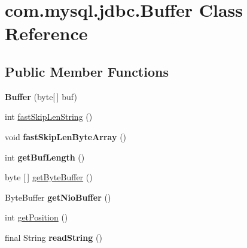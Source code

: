 \hypertarget{classcom_1_1mysql_1_1jdbc_1_1_buffer}{}\section{com.\+mysql.\+jdbc.\+Buffer Class Reference}
\label{classcom_1_1mysql_1_1jdbc_1_1_buffer}
\subsection*{Public Member Functions}
\begin{DoxyCompactItemize}
\item 
\mbox{\label{classcom_1_1mysql_1_1jdbc_1_1_buffer_aded1a2a1e87364b83437aab79524f015}} 
{\bfseries Buffer} (byte\mbox{[}$\,$\mbox{]} buf)
\item 
int \mbox{\hyperlink{classcom_1_1mysql_1_1jdbc_1_1_buffer_a28c84074ea3c21866a0cb59bfa1edcb3}{fast\+Skip\+Len\+String}} ()
\item 
\mbox{\label{classcom_1_1mysql_1_1jdbc_1_1_buffer_aef0e116a1535fa42709dc4f198ff2dc9}} 
void {\bfseries fast\+Skip\+Len\+Byte\+Array} ()
\item 
\mbox{\label{classcom_1_1mysql_1_1jdbc_1_1_buffer_a5fec7969f448c7d92a37ccff056d310f}} 
int {\bfseries get\+Buf\+Length} ()
\item 
byte \mbox{[}$\,$\mbox{]} \mbox{\hyperlink{classcom_1_1mysql_1_1jdbc_1_1_buffer_ae784a6295702aa89204d8d5023e61761}{get\+Byte\+Buffer}} ()
\item 
\mbox{\label{classcom_1_1mysql_1_1jdbc_1_1_buffer_ade4bafd26b1eef0c1a687a3eee62651d}} 
Byte\+Buffer {\bfseries get\+Nio\+Buffer} ()
\item 
int \mbox{\hyperlink{classcom_1_1mysql_1_1jdbc_1_1_buffer_a7dd4c64bfd124ad0a31a962364e7aaf6}{get\+Position}} ()
\item 
\mbox{\label{classcom_1_1mysql_1_1jdbc_1_1_buffer_a42b52657465038b4a391b451bac0f1af}} 
final String {\bfseries read\+String} ()
\item 
\mbox{\label{classcom_1_1mysql_1_1jdbc_1_1_buffer_a680863d9d2797069ce668cc56b17a1a2}} 

\end{DoxyCompactItemize}
